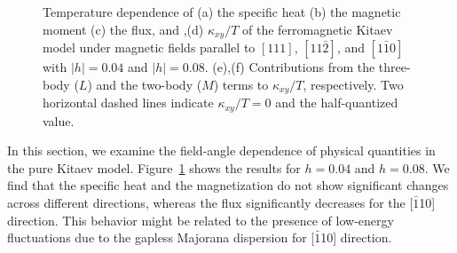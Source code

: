 \documentclass[twocolumn,superscriptaddress,showpacs, longbibliography, aps, prb]{revtex4-2}
\newcommand{\red}[1]{\textcolor{red}{#1}}
\newcommand{\blue}[1]{\textcolor{blue}{#1}}
\begin{document}
\begin{figure}[htb]
\begin{center}
  \end{center}  
  \caption{Temperature dependence of (a) the specific heat (b) the magnetic moment (c) the flux, and ,(d) $\kappa_{xy}/T$ of the ferromagnetic Kitaev model under magnetic fields parallel to $[111]$, $[11\bar{2}]$, and $[1\bar{1}0]$ with $|h|=0.04$ and $|h| = 0.08$. (e),(f) Contributions from the three-body ($L$) and the two-body ($M$) terms to $\kappa_{xy}/T$, respectively. Two horizontal dashed lines indicate $\kappa_{xy}/T = 0$ and the half-quantized value. 
  }
  \label{fig:CMF_ab}
\end{figure}

In this section, we examine the field-angle dependence of physical quantities in the pure Kitaev model.
Figure~\ref{fig:CMF_ab} shows the results for  $h=0.04$ and $h=0.08$.
We find that the specific heat and the magnetization do
not show significant changes %
across different directions, %
whereas the flux significantly decreases
for the [$\bar{1}$10] direction. This behavior 
might be related to the presence of low-energy fluctuations due to the gapless Majorana dispersion for [$\bar{1}$10] direction. 
\end{document}
